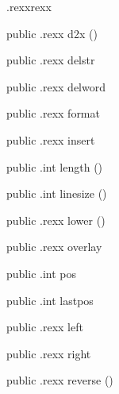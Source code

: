 \begin{CrexxClass}{.rexx}{rexx}
\begin{Members}
    \Method
      {public}
      {.rexx}
      {d2x}
      {()}

    \Method
      {public}
      {.rexx}
      {delstr}
      {}

    \Method
      {public}
      {.rexx}
      {delword}
      {}

    \Method
      {public}
      {.rexx}
      {format}
      {}

    \Method
      {public}
      {.rexx}
      {insert}
      {}

    \Method
      {public}
      {.int}
      {length}
      {()}

    \Method
      {public}
      {.int}
      {linesize}
      {()}

    \Method
      {public}
      {.rexx}
      {lower}
      {()}

    \Method
      {public}
      {.rexx}
      {overlay}
      {}

    \Method
      {public}
      {.int}
      {pos}
      {}

    \Method
      {public}
      {.int}
      {lastpos}
      {}

    \Method
      {public}
      {.rexx}
      {left}
      {}

    \Method
      {public}
      {.rexx}
      {right}
      {}

    \Method
      {public}
      {.rexx}
      {reverse}
      {()}


\end{Members}
\end{CrexxClass}
